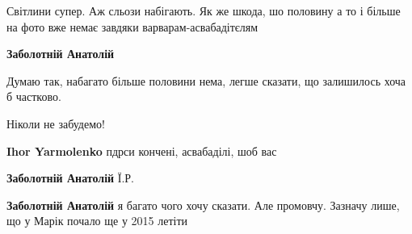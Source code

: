  
 
 
 
 

\qqSecCmt


Світлини супер. Аж сльози набігають. Як же шкода, шо половину а то і більше на
фото вже немає завдяки варварам-асвабадітєлям

\begin{itemize} %
\textbf{Заболотній Анатолій} 

Думаю так, набагато більше половини нема, легше сказати, що залишилось хоча б частково.

Ніколи не забудемо!

\textbf{Ihor Yarmolenko} пдрси кончені, асвабаділі, шоб вас

\textbf{Заболотній Анатолій} Ї.Р.

\textbf{Заболотній Анатолій} я багато чого хочу сказати. Але промовчу.
Зазначу лише, що у Марік почало ще у 2015 летіти
\end{itemize} %
